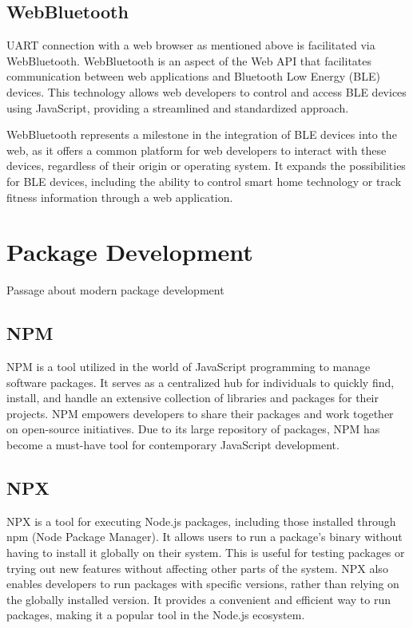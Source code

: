\documentclass{l4proj}
\begin{document}
\subsection{WebBluetooth}
\text UART connection with a web browser as mentioned above is facilitated via WebBluetooth. WebBluetooth is an aspect of the Web API that facilitates communication between web applications and Bluetooth Low Energy (BLE) devices. This technology allows web developers to control and access BLE devices using JavaScript, providing a streamlined and standardized approach.

WebBluetooth represents a milestone in the integration of BLE devices into the web, as it offers a common platform for web developers to interact with these devices, regardless of their origin or operating system. It expands the possibilities for BLE devices, including the ability to control smart home technology or track fitness information through a web application.

\section{Package Development}

Passage about modern package development

\subsection{NPM}
\text NPM is a tool utilized in the world of JavaScript programming to manage software packages. It serves as a centralized hub for individuals to quickly find, install, and handle an extensive collection of libraries and packages for their projects. NPM empowers developers to share their packages and work together on open-source initiatives. Due to its large repository of packages, NPM has become a must-have tool for contemporary JavaScript development.

\subsection{NPX}
\text NPX is a tool for executing Node.js packages, including those installed through npm (Node Package Manager). It allows users to run a package's binary without having to install it globally on their system. This is useful for testing packages or trying out new features without affecting other parts of the system. NPX also enables developers to run packages with specific versions, rather than relying on the globally installed version. It provides a convenient and efficient way to run packages, making it a popular tool in the Node.js ecosystem.
\end{document}
